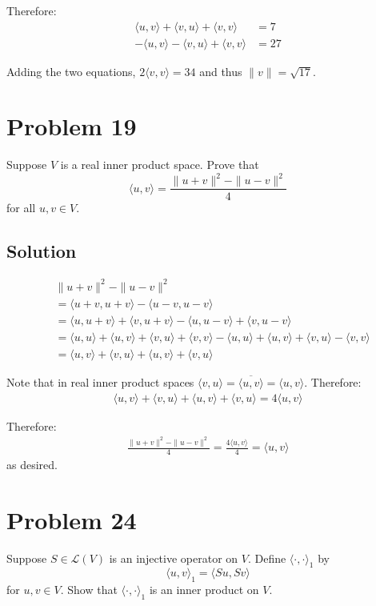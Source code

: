 \documentclass{article}
\begin{document}
Therefore:
\begin{align*}
    \langle u,v\rangle+\langle v,u\rangle+\langle v,v\rangle&=7\\
    -\langle u,v\rangle-\langle v,u\rangle+\langle v,v\rangle&=27
\end{align*}

Adding the two equations, $2\langle v,v\rangle=34$ and thus $\|v\|=\sqrt{17}$.

\section*{Problem 19}
Suppose $V$ is a real inner product space. Prove that
\[\langle u,v\rangle=\frac{\|u+v\|^2-\|u-v\|^2}{4}\]
for all $u,v\in V$.

\subsection*{Solution}
\begin{align*}
    &\|u+v\|^2-\|u-v\|^2\\
    &=\langle u+v,u+v\rangle-\langle u-v,u-v\rangle\\
    &=\langle u, u+v\rangle + \langle v, u+v\rangle-\langle u, u-v\rangle+\langle v,u-v\rangle\\
    &=\langle u, u\rangle+\langle u,v\rangle+\langle v,u\rangle+\langle v,v\rangle-\langle u,u\rangle+\langle u,v\rangle+\langle v,u\rangle-\langle v,v\rangle\\
    &=\langle u,v\rangle+\langle v,u\rangle+\langle u,v\rangle+\langle v,u\rangle
\end{align*}

Note that in real inner product spaces $\langle v,u\rangle=\overline{\langle u,v\rangle}=\langle u,v\rangle$. Therefore:
\begin{align*}
    \langle u,v\rangle+\langle v,u\rangle+\langle u,v\rangle+\langle v,u\rangle=4\langle u,v\rangle
\end{align*}

Therefore:
\begin{align*}
    \frac{\|u+v\|^2-\|u-v\|^2}{4}=\frac{4\langle u,v\rangle}{4}=\langle u,v\rangle
\end{align*}
as desired.

\section*{Problem 24}
Suppose $S\in\mathcal{L}(V)$ is an injective operator on $V$. Define $\langle \cdot,\cdot \rangle_1$ by
\[\langle u,v\rangle_1=\langle Su,Sv\rangle\]
for $u,v\in V$. Show that $\langle\cdot,\cdot\rangle_1$ is an inner product on $V$.
\end{document}
